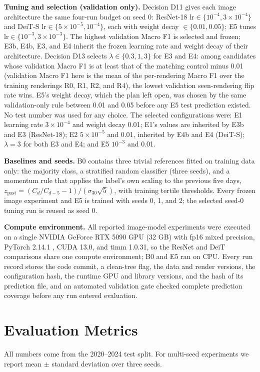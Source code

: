 \documentclass[10pt,journal,compsoc]{IEEEtran}
\begin{document}
\textbf{Tuning and selection (validation only).} Decision D11 gives each image architecture the same four-run budget on seed 0: ResNet-18 $\mathrm{lr} \in \{10^{-4}, 3\times10^{-4}\}$ and DeiT-S $\mathrm{lr} \in \{5\times10^{-5}, 10^{-4}\}$, each with weight decay $\in \{0.01, 0.05\}$; E5 tunes $\mathrm{lr} \in \{10^{-3}, 3\times10^{-3}\}$. The highest validation Macro F1 is selected and frozen; E3b, E4b, E3, and E4 inherit the frozen learning rate and weight decay of their architecture. Decision D13 selects $\lambda \in \{0.3, 1, 3\}$ for E3 and E4: among candidates whose validation Macro F1 is at least that of the matching control minus 0.01 (validation Macro F1 here is the mean of the per-rendering Macro F1 over the training renderings R0, R1, R2, and R4), the lowest validation seen-rendering flip rate wins. E5's weight decay, which the plan left open, was chosen by the same validation-only rule between 0.01 and 0.05 before any E5 test prediction existed. No test number was used for any choice. The selected configurations were: E1 learning rate $3\times10^{-4}$ and weight decay 0.01; E1's values are inherited by E3b and E3 (ResNet-18); E2 $5\times10^{-5}$ and 0.01, inherited by E4b and E4 (DeiT-S); $\lambda = 3$ for both E3 and E4; and E5 $10^{-3}$ and 0.01.

\textbf{Baselines and seeds.} B0 contains three trivial references fitted on training data only: the majority class, a stratified random classifier (three seeds), and a momentum rule that applies the label's own scaling to the previous five days, $z_{\text{past}} = (C_d/C_{d-5} - 1)/(\sigma_{30}\sqrt{5})$, with training tertile thresholds. Every frozen image experiment and E5 is trained with seeds 0, 1, and 2; the selected seed-0 tuning run is reused as seed 0.

\textbf{Compute environment.} All reported image-model experiments were executed on a single NVIDIA GeForce RTX 5090 GPU (32 GB) with fp16 mixed precision, PyTorch 2.14.1 \cite{paszke2019pytorch}, CUDA 13.0, and timm 1.0.31, so the ResNet and DeiT comparisons share one compute environment; B0 and E5 ran on CPU. Every run record stores the code commit, a clean-tree flag, the data and render versions, the configuration hash, the runtime GPU and library versions, and the hash of its prediction file, and an automated validation gate checked complete prediction coverage before any run entered evaluation.

\section{Evaluation Metrics}\label{sec:metrics}
All numbers come from the 2020--2024 test split. For multi-seed experiments we report mean $\pm$ standard deviation over three seeds.
\end{document}
